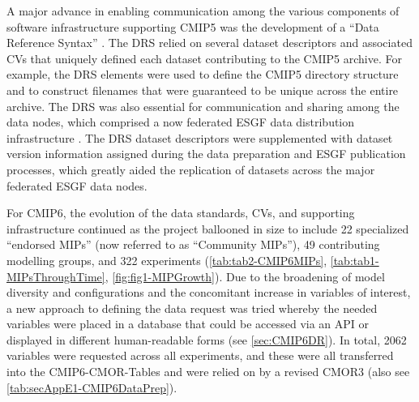 \documentclass[manuscript]{copernicus}
\begin{document}
A major advance in enabling communication among the various components of software infrastructure supporting CMIP5 was the development of a ``Data Reference Syntax'' \citep[DRS;][]{taylor_pcmdi_2012}. The DRS relied on several dataset descriptors and associated CVs that uniquely defined each dataset contributing to the CMIP5 archive. For example, the DRS elements were used to define the CMIP5 directory structure and to construct filenames that were guaranteed to be unique across the entire archive. The DRS was also essential for communication and sharing among the data nodes, which comprised a now federated ESGF data distribution infrastructure \citep[\autoref{sec:earthSystemGridFederation};][]{williams_earth_2011}. The DRS dataset descriptors were supplemented with dataset version information assigned during the data preparation and ESGF publication processes, which greatly aided the replication of datasets across the major federated ESGF data nodes.

For CMIP6, the evolution of the data standards, CVs, and supporting infrastructure continued as the project ballooned in size to include 22 specialized ``endorsed MIPs'' (now referred to as ``Community MIPs''), 49 contributing modelling groups, and 322 experiments (\autoref{tab:tab2-CMIP6MIPs}, \autoref{tab:tab1-MIPsThroughTime}, \autoref{fig:fig1-MIPGrowth}). Due to the broadening of model diversity and configurations and the concomitant increase in variables of interest, a new approach to defining the data request was tried whereby the needed variables were placed in a database that could be accessed via an API or displayed in different human-readable forms (see \autoref{sec:CMIP6DR}). In total, 2062 variables were requested across all experiments, and these were all transferred into the CMIP6-CMOR-Tables \citep{nadeau_cmip6_2017} and were relied on by a revised CMOR3 \citep{mauzey_cmor_2024} (also see \autoref{tab:secAppE1-CMIP6DataPrep}).
\end{document}
